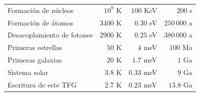 {\begin{table}[t]
\begin{tabular}{lrrr}
                \rowcolor{migris!50}
                {\color[HTML]{FFFFFF} Formación de núcleos}       & {\color[HTML]{FFFFFF} \(10^{9}\) K}                               & {\color[HTML]{FFFFFF} \(100\) KeV}                                & {\color[HTML]{FFFFFF} \(200\) s}                                  \\
                Formación de átomos                               & \(3400\) K                                                        & \(0.30\) eV                                                       & \(250\,000\) a                                                    \\
                \rowcolor{migris!50}
                {\color[HTML]{FFFFFF} Desacoplamiento de fotones} & {\color[HTML]{FFFFFF} \(2900\) K}                                 & {\color[HTML]{FFFFFF} \(0.25\) eV}                                & {\color[HTML]{FFFFFF} \(380\,000\) a}                             \\
                Primeras estrellas                                & \(50\) K                                                          & \(4\) meV                                                         & \(100\) Ma                                                        \\
                \rowcolor{migris!50}
                {\color[HTML]{FFFFFF} Primeras galaxias}          & {\color[HTML]{FFFFFF} \(20\) K}                                   & {\color[HTML]{FFFFFF} \(1.7\) meV}                                & {\color[HTML]{FFFFFF} \(1\) Ga}                                   \\
                Sistema solar                                     & \(3.8\) K                                                         & \(0.33\) meV                                                      & \(9\) Ga                                                          \\
                \rowcolor{migris!50}
                {\color[HTML]{FFFFFF} Escritura de este TFG}      & {\color[HTML]{FFFFFF} \(2.7\) K}                                  & {\color[HTML]{FFFFFF} \(0.23\) meV}                               & {\color[HTML]{FFFFFF} \(13.8\) Ga}                                \\ \bottomrule
            \end{tabular}
        \end{table}}

